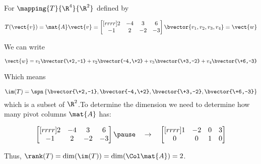 \documentclass{beamer}
\begin{document}
\begin{frame}
\begin{example}
For $\mapping{T}{\R^4}{\R^2}$ defined by

\vspace{-6mm}
\begin{equation*}
T(\vect{v})=\mat{A}\vect{v}=
\begin{bmatrix}[rrrr]
2 & -4 & 3 & 6 \\
-1 & 2 & -2 & -3 \\
\end{bmatrix}
\bvector{v_1,v_2,v_3,v_4}=\vect{w}
\end{equation*}\pause

\vspace{-6mm}
We can write

\vspace{-1mm}
\begin{equation*}
\vect{w}=v_1 \bvector{\+2,-1} + v_2 \bvector{-4,\+2} + v_3 \bvector{\+3,-2} + v_4 \bvector{\+6,-3}
\end{equation*}\pause

\vspace{-6mm}
Which means 

\vspace{-1mm}
\begin{equation*}
\im(T)=\spn\left\{\bvector{\+2,-1}, \bvector{-4,\+2}, \bvector{\+3,-2}, \bvector{\+6,-3}\right\}
\end{equation*}
which is a subset of $\R^2$.\pause To determine the dimension we need to determine how many pivot columns $\mat{A}$ has:

\vspace{-2mm}
\begin{equation*}
\begin{bmatrix}[rrrr]
2 & -4 & 3 & 6 \\
-1 & 2 & -2 & -3 \\
\end{bmatrix}\pause
\quad\rightarrow\quad
\begin{bmatrix}[rrrr]
1 & -2 & 0 & 3 \\
0 & 0 & 1 & 0 \\
\end{bmatrix}
\end{equation*}

\vspace{-3mm}
Thus, $\rank(T)=\dim(\im(T))=\dim(\Col\mat{A})=2$.
\end{example}
\end{frame}
\end{document}
